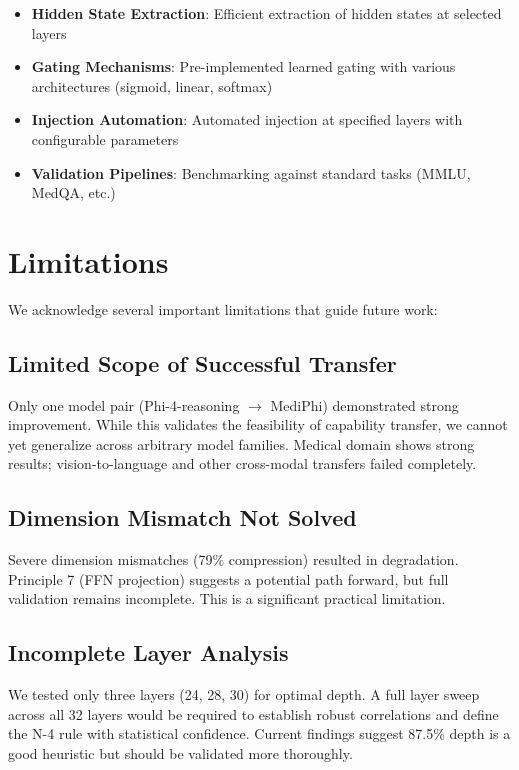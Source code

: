 \documentclass[11pt,a4paper]{article}
\begin{document}
\begin{itemize}
    \item \textbf{Hidden State Extraction}: Efficient extraction of hidden states at selected layers
    \item \textbf{Gating Mechanisms}: Pre-implemented learned gating with various architectures (sigmoid, linear, softmax)
    \item \textbf{Injection Automation}: Automated injection at specified layers with configurable parameters
    \item \textbf{Validation Pipelines}: Benchmarking against standard tasks (MMLU, MedQA, etc.)
\end{itemize}

\section{Limitations}

We acknowledge several important limitations that guide future work:

\subsection{Limited Scope of Successful Transfer}
Only one model pair (Phi-4-reasoning $\to$ MediPhi) demonstrated strong improvement. While this validates the feasibility of capability transfer, we cannot yet generalize across arbitrary model families. Medical domain shows strong results; vision-to-language and other cross-modal transfers failed completely.

\subsection{Dimension Mismatch Not Solved}
Severe dimension mismatches (79\% compression) resulted in degradation. Principle 7 (FFN projection) suggests a potential path forward, but full validation remains incomplete. This is a significant practical limitation.

\subsection{Incomplete Layer Analysis}
We tested only three layers (24, 28, 30) for optimal depth. A full layer sweep across all 32 layers would be required to establish robust correlations and define the N-4 rule with statistical confidence. Current findings suggest 87.5\% depth is a good heuristic but should be validated more thoroughly.
\end{document}
